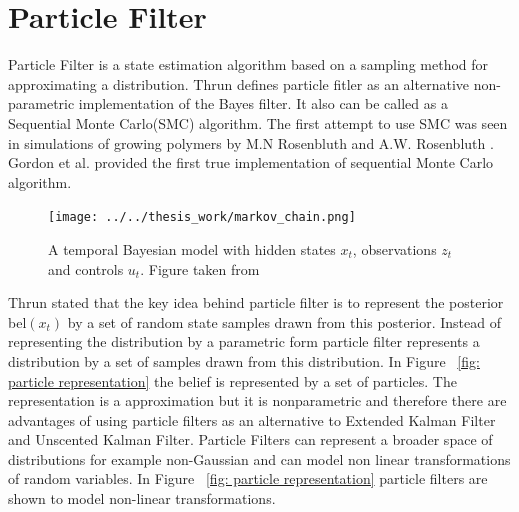 \documentclass[12pt]{dalcsthesis}
\begin{document}
\section{Particle Filter}
Particle Filter is a state estimation algorithm based on a sampling method for approximating a distribution. Thrun \cite{thrun2005probabilistic} defines particle fitler as an alternative non-parametric implementation of the Bayes filter. It also can be called as a Sequential Monte Carlo(SMC) algorithm. The first attempt to use SMC was seen in simulations of growing polymers by M.N Rosenbluth and A.W. Rosenbluth \cite{rosenbluth1955monte}. Gordon et al. \cite{gordon1993novel} provided the first true implementation of sequential Monte Carlo algorithm. 

\begin{figure}
  \centering
     {\texttt{[image: ../../thesis\_work/markov\_chain.png]}}
  \caption{\label{fig-Markov Chain} A temporal Bayesian model with hidden states $x_{t}$, observations $z_{t}$ and controls $u_{t}$. Figure taken from \cite{thrun2005probabilistic}}
\end{figure}

Thrun \cite{thrun2005probabilistic} stated that the key idea behind particle filter is to represent the posterior bel$(x_{t})$ by a set of random state samples drawn from this posterior. Instead of representing the distribution by a parametric form particle filter represents a distribution by a set of samples drawn from this distribution. In Figure ~\ref{fig: particle representation} the belief is represented by a set of particles. The representation is a approximation but it is nonparametric and therefore there are advantages of using particle filters as an alternative to Extended Kalman Filter and Unscented Kalman Filter. Particle Filters can represent a broader space of distributions for example non-Gaussian and can model non linear transformations of random variables. In Figure ~\ref{fig: particle representation} particle filters are shown to model non-linear transformations. 
\end{document}
